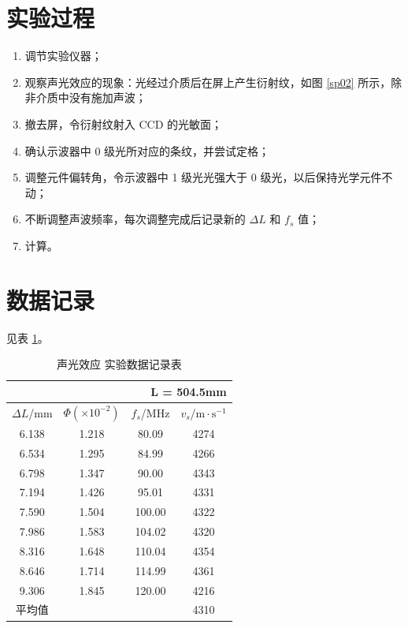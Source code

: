 \documentclass[12pt]{ctexart}
\begin{document}
    \section{实验过程}

    \begin{enumerate}
        \item 调节实验仪器；
        \item 观察声光效应的现象：光经过介质后在屏上产生衍射纹，如图 \ref{sp02} 所示，除非介质中没有施加声波；
        \item 撤去屏，令衍射纹射入 CCD 的光敏面；
        \item 确认示波器中 0 级光所对应的条纹，并尝试定格；
        \item 调整元件偏转角，令示波器中 1 级光光强大于 0 级光，以后保持光学元件不动；
        \item 不断调整声波频率，每次调整完成后记录新的 $\Delta L$ 和 $f_s$ 值；
        \item 计算。
    \end{enumerate}

    \section{数据记录}

    见表 \ref{result}。

    \begin{table}[hp]
        \centering
        \caption{声光效应 实验数据记录表}
        \label{result}
        \begin{tabular}{|c|c|c|c|}
            \multicolumn{4}{r}{\small{L = 504.5mm}} \\ \hline
            $\Delta L$/mm & $\Phi (\times 10^{-2})$ & $f_s$/MHz & $v_s$/$\mathrm{m} \cdot \mathrm{s}^{-1}$ \\ \hline
            6.138 & 1.218 & 80.09 & 4274 \\ \hline
            6.534 & 1.295 & 84.99 & 4266 \\ \hline
            6.798 & 1.347 & 90.00 & 4343 \\ \hline
            7.194 & 1.426 & 95.01 & 4331 \\ \hline
            7.590 & 1.504 & 100.00 & 4322 \\ \hline
            7.986 & 1.583 & 104.02 & 4320 \\ \hline
            8.316 & 1.648 & 110.04 & 4354 \\ \hline
            8.646 & 1.714 & 114.99 & 4361 \\ \hline
            9.306 & 1.845 & 120.00 & 4216 \\ \hline
            \multicolumn{1}{|c}{平均值} & \multicolumn{2}{c}{} & \multicolumn{1}{c|}{4310} \\ \hline
        \end{tabular}
    \end{table}
\end{document}
